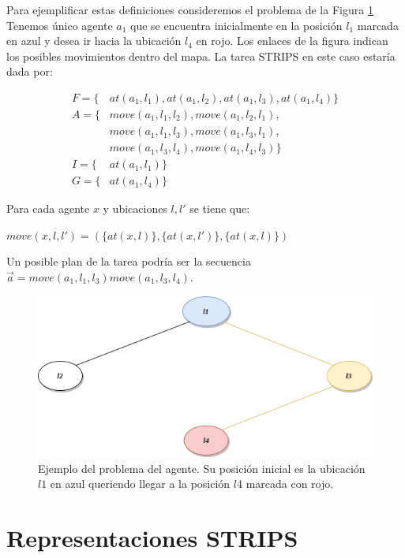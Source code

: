 Para ejemplificar estas definiciones consideremos el problema de la Figura
\ref{fig:agent_example} Tenemos único agente $a_1$ que se encuentra inicialmente
en la posición $l_1$ marcada en azul y desea ir hacia la ubicación $l_4$ en
rojo. Los enlaces de la figura indican los posibles movimientos dentro del mapa.
La tarea STRIPS en este caso estaría dada por:

\begin{align*}
    F = \{&at(a_1, l_1), at(a_1, l_2), at(a_1, l_3), at(a_1, l_4)\} \\
    A = \{&move(a_1, l_1, l_2), move(a_1, l_2, l_1), \\
    & move(a_1, l_1, l_3), move(a_1, l_3, l_1),\\
    & move(a_1, l_3, l_4), move(a_1, l_4, l_3)\} \\
    I = \{&at(a_1, l_1)\} \\
    G = \{&at(a_1, l_4)\}
\end{align*}

Para cada agente $x$ y ubicaciones $l, l'$ se tiene que:
\begin{center}
    $move(x, l, l') = (\{at(x, l)\}, \{at(x, l')\}, \{at(x, l)\})$
\end{center}

Un posible plan de la tarea podría ser la secuencia $\vec{a} = move(a_1, l_1, l_3)move(a_1, l_3, l_4)$.

\begin{figure}
    \centering
    \includegraphics[scale=0.5]{figures/agent_example.png}
    \caption{Ejemplo del problema del agente. Su posición inicial es la ubicación
             $l1$ en azul queriendo llegar a la posición $l4$ marcada con rojo.}
    \label{fig:agent_example}
\end{figure}

\section{Representaciones STRIPS}

